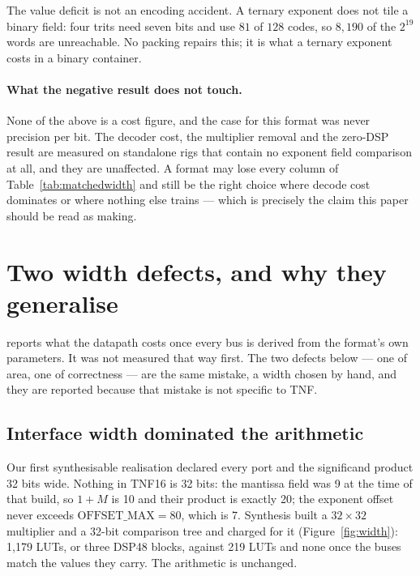 The value deficit is not an encoding accident. A ternary exponent does not tile
a binary field: four trits need seven bits and use $81$ of $128$ codes, so
$8{,}190$ of the $2^{19}$ words are unreachable. No packing repairs this; it is
what a ternary exponent costs in a binary container.

\paragraph{What the negative result does not touch.} None of the above is a
cost figure, and the case for this format was never precision per bit. The
decoder cost, the multiplier removal and the zero-DSP result are measured on
standalone rigs that contain no exponent field comparison at all, and they are
unaffected. A format may lose every column of
Table~\ref{tab:matchedwidth} and still be the right choice where decode cost
dominates or where nothing else trains --- which is precisely the claim this
paper should be read as making.


\section{Two width defects, and why they generalise}\label{sec:width}

 reports what the datapath costs once every bus is
derived from the format's own parameters. It was not measured that way first.
The two defects below --- one of area, one of correctness --- are the same
mistake, a width chosen by hand, and they are reported because that mistake is
not specific to TNF.

\subsection{Interface width dominated the arithmetic}
Our first synthesisable realisation declared every port and the significand
product 32 bits wide. Nothing in TNF16 is 32 bits: the mantissa field was 9 at
the time of that build, so $1{+}M$ is 10 and their product is exactly 20; the exponent offset never exceeds
$\mathrm{OFFSET\_MAX}=80$, which is 7. Synthesis built a $32\times32$ multiplier
and a 32-bit comparison tree and charged for it (Figure~\ref{fig:width}):
1{,}179 LUTs, or three DSP48 blocks, against 219 LUTs and none once the buses
match the values they carry. The arithmetic is unchanged.

